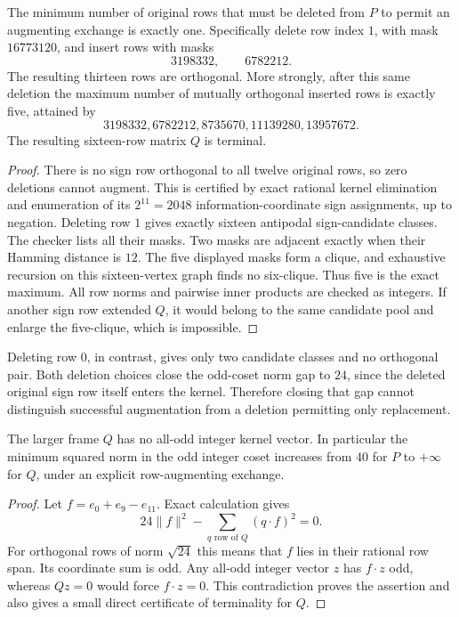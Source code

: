 \begin{proposition}
The minimum number of original rows that must be deleted from $P$
to permit an augmenting exchange is exactly one. Specifically delete
row index $1$, with mask $16773120$, and insert rows with masks
\[
3198332,\qquad6782212.
\]
The resulting thirteen rows are orthogonal. More strongly, after this
same deletion the maximum number of mutually orthogonal inserted
rows is exactly five, attained by
\[
3198332,6782212,8735670,11139280,13957672.
\]
The resulting sixteen-row matrix $Q$ is terminal.
\end{proposition}
\begin{proof}
There is no sign row orthogonal to all twelve original rows, so zero
deletions cannot augment. This is certified by exact rational kernel
elimination and enumeration of its $2^{11}=2048$ information-coordinate
sign assignments, up to negation.
Deleting row $1$ gives exactly sixteen antipodal sign-candidate classes.
The checker lists all their masks. Two masks are adjacent exactly when
their Hamming distance is $12$. The five displayed masks form a clique,
and exhaustive recursion on this sixteen-vertex graph finds no
six-clique. Thus five is the exact maximum. All row norms and pairwise
inner products are checked as integers.
If another sign row extended $Q$, it would belong to the same candidate
pool and enlarge the five-clique, which is impossible.
\end{proof}

Deleting row $0$, in contrast, gives only two candidate classes and
no orthogonal pair. Both deletion choices close the odd-coset norm gap
to $24$, since the deleted original sign row itself enters the kernel.
Therefore closing that gap cannot distinguish successful augmentation
from a deletion permitting only replacement.

\begin{proposition}
The larger frame $Q$ has no all-odd integer kernel vector. In particular
the minimum squared norm in the odd integer coset increases from
$40$ for $P$ to $+\infty$ for $Q$, under an explicit row-augmenting
exchange.
\end{proposition}
\begin{proof}
Let $f=e_0+e_9-e_{11}$. Exact calculation gives
\[
 24\|f\|^2-\sum_{q\text{ row of }Q}(q\cdot f)^2=0.
\]
For orthogonal rows of norm $\sqrt{24}$ this means that $f$ lies in
their rational row span. Its coordinate sum is odd. Any all-odd integer
vector $z$ has $f\cdot z$ odd, whereas $Qz=0$ would force
$f\cdot z=0$. This contradiction proves the assertion and also gives
a small direct certificate of terminality for $Q$.
\end{proof}

